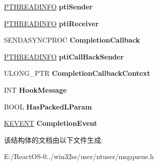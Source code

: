 \begin{DoxyCompactItemize}
\hyperlink{struct___t_h_r_e_a_d_i_n_f_o}{P\+T\+H\+R\+E\+A\+D\+I\+N\+FO} {\bfseries pti\+Sender}
\item 
\mbox{\label{struct___u_s_e_r___s_e_n_t___m_e_s_s_a_g_e_a7f8a2d5877c67c3388721060a7191805}} 
\hyperlink{struct___t_h_r_e_a_d_i_n_f_o}{P\+T\+H\+R\+E\+A\+D\+I\+N\+FO} {\bfseries pti\+Receiver}
\item 
\mbox{\label{struct___u_s_e_r___s_e_n_t___m_e_s_s_a_g_e_a64cb4db5cc378ff2f78e9cd3d099e602}} 
S\+E\+N\+D\+A\+S\+Y\+N\+C\+P\+R\+OC {\bfseries Completion\+Callback}
\item 
\mbox{\label{struct___u_s_e_r___s_e_n_t___m_e_s_s_a_g_e_a96bf7e8d6d2eb3c99a7cca0f0f964637}} 
\hyperlink{struct___t_h_r_e_a_d_i_n_f_o}{P\+T\+H\+R\+E\+A\+D\+I\+N\+FO} {\bfseries pti\+Call\+Back\+Sender}
\item 
\mbox{\label{struct___u_s_e_r___s_e_n_t___m_e_s_s_a_g_e_a53c33275907fb70280fb104f9a43b25c}} 
U\+L\+O\+N\+G\+\_\+\+P\+TR {\bfseries Completion\+Callback\+Context}
\item 
\mbox{\label{struct___u_s_e_r___s_e_n_t___m_e_s_s_a_g_e_acce10058ced6b67428c7fb52d76f1820}} 
I\+NT {\bfseries Hook\+Message}
\item 
\mbox{\label{struct___u_s_e_r___s_e_n_t___m_e_s_s_a_g_e_a6d14ea2d25ff9e499aaddc645ffd41cb}} 
B\+O\+OL {\bfseries Has\+Packed\+L\+Param}
\item 
\mbox{\label{struct___u_s_e_r___s_e_n_t___m_e_s_s_a_g_e_a4fe85de2bd5dd509a2e889d490f4669e}} 
\hyperlink{struct___k_e_v_e_n_t}{K\+E\+V\+E\+NT} {\bfseries Completion\+Event}
\end{DoxyCompactItemize}


该结构体的文档由以下文件生成\+:\begin{DoxyCompactItemize}
\item 
E\+:/\+React\+O\+S-\/0../win32ss/user/ntuser/msgqueue.\+h\end{DoxyCompactItemize}
